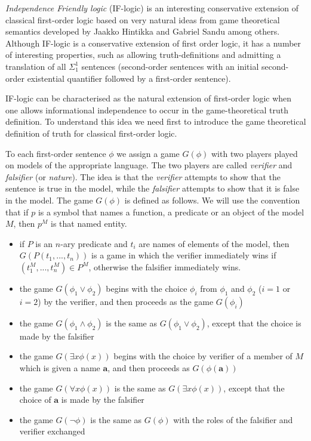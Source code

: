 \documentclass[12pt]{article}
\begin{document}
\emph{Independence Friendly logic} (IF-logic) is an interesting conservative extension of classical first-order logic based on very natural ideas from game theoretical semantics developed by Jaakko Hintikka and Gabriel Sandu among others. Although IF-logic is a conservative extension of first order logic, it has a number of interesting properties, such as allowing truth-definitions and admitting a translation of all $\Sigma^1_1$ sentences (second-order sentences with an initial second-order existential quantifier followed by a first-order sentence).

IF-logic can be characterised as the natural extension of first-order logic when one allows informational independence to occur in the game-theoretical truth definition. To understand this idea we need first to introduce the game theoretical definition of truth for classical first-order logic.

To each first-order sentence $\phi$ we assign a game $G(\phi)$ with two players played on models of the appropriate language. The two players are called {\em verifier} and {\em falsifier} (or {\em nature}). The idea is that the {\em verifier} attempts to show that the sentence is true in the model, while the {\em falsifier} attempts to show that it is false in the model. The game $G(\phi)$ is defined as follows. We will use the convention that if $p$ is a symbol that names a function, a predicate or an object of the model $M$, then $p^M$ is that named entity.

\begin{itemize}
 \item if $P$ is an $n$-ary predicate and $t_i$ are names of elements of the
       model, then $G(P(t_1,...,t_n))$ is a game in which the verifier 
       immediately wins if $(t^M_1,...,t^M_n) \in P^M$, otherwise
       the falsifier immediately wins.
 \item the game $G(\phi_1 \vee \phi_2)$ begins with the choice $\phi_i$ from 
       $\phi_1$ and $\phi_2$ ($i = 1$ or $i = 2$) by the verifier, and then
       proceeds as the game $G(\phi_i)$
 \item the game $G(\phi_1 \wedge \phi_2)$ is the same as $G(\phi_1 \vee
       \phi_2)$, except that the choice is made by the falsifier
 \item the game $G(\exists x \phi(x))$ begins with the choice by verifier
       of a member of $M$ which is given a name $\mathbf{a}$, and then proceeds
       as $G(\phi(\mathbf{a}))$
 \item the game $G(\forall x \phi(x))$ is the same as $G(\exists x \phi(x))$, 
       except that the choice of $\mathbf{a}$ is made by the falsifier
 \item the game $G(\neg \phi)$ is the same as $G(\phi)$ with the roles of the
       falsifier and verifier exchanged
\end{itemize}
\end{document}

